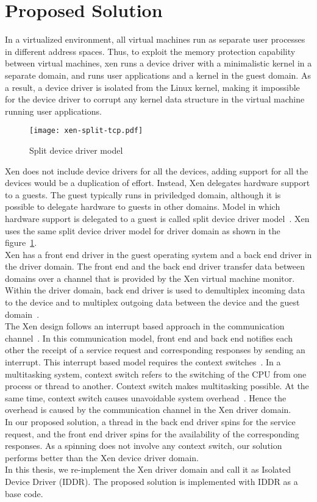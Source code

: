 \section {Proposed Solution} 

In a virtualized environment, all virtual machines run as separate user processes in different address spaces. Thus, to exploit the memory protection capability between virtual machines, xen runs a device driver with a minimalistic kernel in a separate domain, and runs user applications and a kernel in the guest domain. As a result, a device driver is isolated from the Linux kernel, making it impossible for the device driver to corrupt any kernel data structure in the virtual machine running user applications. 
\begin{figure}[!ht]
\centering
\texttt{[image: xen-split-tcp.pdf]}
\caption{Split device driver model}
\label{fig:xen-split}
\end{figure}
Xen does not include device drivers for all the devices, adding support for all the devices would be a duplication of effort. Instead, Xen delegates hardware support to a guests. The guest typically runs in priviledged domain, although it is possible to delegate hardware to guests in other domains. Model in which hardware support is delegated to a guest is called split device driver model~\cite{Chisnall:2007:DGX:1407351}. Xen uses the same split device driver model for driver domain as shown in the figure~\ref{fig:xen-split}.
\\
Xen has a front end driver in the guest operating system and a back end driver in the driver domain. The front end and the back end driver transfer data between domains over a channel that is provided by the Xen virtual machine monitor. Within the driver domain, back end driver is used to demultiplex incoming data to the device and to multiplex outgoing data between the device and the guest domain~\cite{driverdomain}.
\\
The Xen design follows an interrupt based approach in the communication channel~\cite{Barham:2003:XAV:945445.945462}. In this communication model, front end and back end notifies each other the receipt of a service request and corresponding responses by sending an interrupt. This interrupt based model requires the context switches~\cite{Barham:2003:XAV:945445.945462}. In a multitasking system, context switch refers to the switching of the CPU from one process or thread to another. Context switch makes multitasking possible. At the same time, context switch causes unavoidable system overhead~\cite{Li:2007:QCC:1281700.1281702, Mogul:1991:ECS:106973.106982}. Hence the overhead is caused by the communication channel in the Xen driver domain. 
\\
In our proposed solution, a thread in the back end driver spins for the service request, and the front end driver spins for the availability of the corresponding responses. As a spinning does not involve any context switch, our solution performs better than the Xen device driver domain. 
\\
In this thesis, we re-implement the Xen driver domain and call it as Isolated Device Driver (IDDR). The proposed solution is implemented with IDDR as a base code.
\pagebreak

